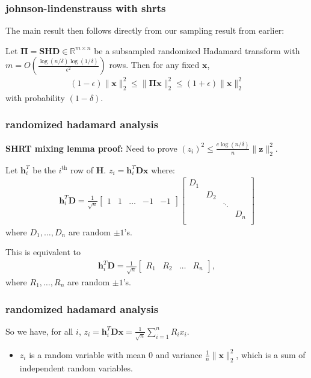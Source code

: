 \documentclass[compress]{beamer}
\newcommand{\bs}[1]{\boldsymbol{#1}}
\newcommand{\bv}[1]{\mathbf{#1}}
\newcommand{\R}{\mathbb{R}}
\begin{document}
\begin{frame}[t]
	\frametitle{johnson-lindenstrauss with shrts}
	The main result then follows directly from our sampling result from earlier:
		\begin{theorem}
		Let $\bs{\Pi} = \bv{SHD} \in \R^{m\times n}$ be a subsampled randomized Hadamard transform with $m = O\left(\frac{\log(n/\delta)\log(1/\delta)}{\epsilon^2}\right)$ rows. Then for any fixed $\bv{x}$, 
		\begin{align*}
		(1-\epsilon)\|\bv{x}\|_2^2 \leq  \|\bs{\Pi}\bv{x}\|_2^2 \leq (1+\epsilon) \|\bv{x}\|_2^2
		\end{align*}
		with probability $(1-\delta)$. 
	\end{theorem}
\begin{center}
\end{center}
\end{frame}

\begin{frame}[t]
	\frametitle{randomized hadamard analysis}
	\textbf{SHRT mixing lemma proof:}
	Need to prove $(z_i)^2 \leq \frac{c\log(n/\delta)}{n} \|\bv{z}\|_2^2$. 
	
	Let $\bv{h}_i^T$ be the $i^\text{th}$ row of $\bv{H}$. ${z}_i = \bv{h}_i^T\bv{D}\bv{x}$ where:
	\begin{align*}
	\bv{h}_i^T\bv{D} = \frac{1}{\sqrt{n}}\begin{bmatrix} 1 & 1 & \ldots & -1 & -1 \end{bmatrix}
	\begin{bmatrix} 
		D_1 &  &  & \\ 
		& D_2  &  & \\ 
		& &  \ddots  & \\ 
		& &   &  D_n \\ 
		\end{bmatrix}
	\end{align*}
	where $D_1, \ldots, D_n$ are random $\pm 1$'s.
	
	This is equivalent to
	\begin{align*}
	\bv{h}_i^T\bv{D}  = \frac{1}{\sqrt{n}}\begin{bmatrix} R_1 & R_2 & \ldots & R_n \end{bmatrix}, 
	\end{align*}
where $R_1, \ldots, R_n$ are random $\pm 1$'s.

\end{frame}

\begin{frame}[t]
	\frametitle{randomized hadamard analysis}
	So we have, for all $i$,
	${z}_i = \bv{h}_i^T\bv{D}\bv{x} = \frac{1}{\sqrt{n}}\sum_{i=1}^n R_i x_i.$
	
	\begin{itemize}
	\item ${z}_i$ is a random variable with mean $0$ and variance $\frac{1}{n}\|\bv{x}\|_2^2$, which is a sum of independent random variables. 
	\end{itemize}
\end{frame}
\end{document}
